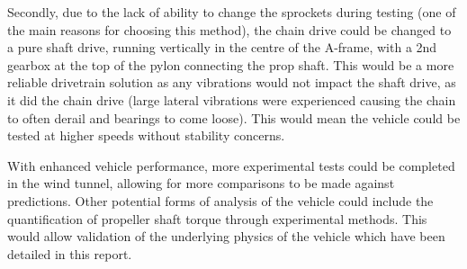 Secondly, due to the lack of ability to change the sprockets during testing (one of the main reasons for choosing this method), the chain drive could be changed to a pure shaft drive, running vertically in the centre of the A-frame, with a 2nd gearbox at the top of the pylon connecting the prop shaft. This would be a more reliable drivetrain solution as any vibrations would not impact the shaft drive, as it did the chain drive (large lateral vibrations were experienced causing the chain to often derail and bearings to come loose). This would mean the vehicle could be tested at higher speeds without stability concerns.

With enhanced vehicle performance, more experimental tests could be completed in the wind tunnel, allowing for more comparisons to be made against predictions. Other potential forms of analysis of the vehicle could include the quantification of propeller shaft torque through experimental methods. This would allow validation of the underlying physics of the vehicle which have been detailed in this report.


